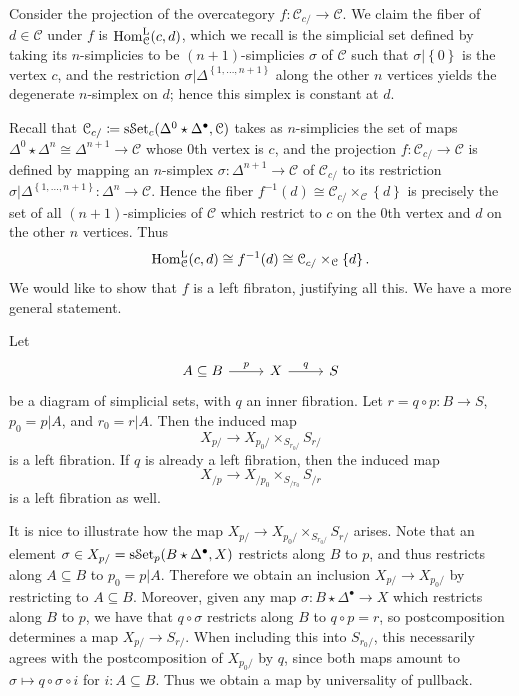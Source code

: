 Consider the projection of the overcategory $f : \mathcal{C} _{c/} \to \mathcal{C} $. We claim the fiber of $d\in \mathcal{C}$ under $f$ is $\operatorname{Hom}_\mathcal{C} ^\mathrm{L} (c, d) $, which we recall is the simplicial set defined by taking its $n$-simplicies to be $(n+1)$-simplicies $\sigma $ of $\mathcal{C} $ such that $\sigma |\left\{ 0 \right\} $ is the vertex $c$, and the restriction $\sigma |\Delta ^{\left\{ 1, \ldots ,n+1 \right\} } $ along the other $n$ vertices yields the degenerate $n$-simplex on $d$; hence this simplex is constant at $d$.

Recall that $\mathcal{C} _{c/} \coloneqq \mathrm{s}\mathcal{S}\mathrm{et}_c(\Delta^0\star\Delta ^{\bullet},\mathcal{C} )$ takes as $n$-simplicies the set of maps $\Delta ^0\star \Delta ^n \cong \Delta ^{n+1} \to \mathcal{C} $ whose 0th vertex is $c$, and the projection $f : \mathcal{C} _{c/}  \to \mathcal{C} $ is defined by mapping an $n$-simplex $\sigma : \Delta ^{n+1}  \to \mathcal{C} $ of $\mathcal{C} _{c/} $ to its restriction $\sigma |\Delta ^{\left\{ 1, \ldots ,n+1 \right\} } : \Delta ^n \to \mathcal{C} $. Hence the fiber $f^{-1} (d) \cong \mathcal{C}_{c/} \times_{\mathcal{C} } \left\{ d \right\} $ is precisely the set of all $(n+1)$-simplicies of $\mathcal{C} $ which restrict to $c$ on the 0th vertex and $d$ on the other $n$ vertices. Thus
\[
	\operatorname{Hom}_\mathcal{C} ^{\mathrm{L} } (c, d) \cong f^{-1} (d) \cong \mathcal{C} _{c/} \times _\mathcal{C} \left\{ d \right\} 
.\]
We would like to show that $f$ is a left fibraton, justifying all this. We have a more general statement.

\begin{proposition}[Joyal]\label{2.1.2.1}
	Let
	\[\begin{tikzcd}[row sep = 2.5em, column sep = 2.5em]
	A\subseteq B \ar[" p ", r]  & X \ar[" q ", r]  & S
	\end{tikzcd}\]
	be a diagram of simplicial sets, with $q$ an inner fibration. Let $r=q\circ p : B \to S$, $p_0=p|A$, and $r_0=r|A$. Then the induced map
	\[
		X_{p/} \to X_{p_0/} \times_{S_{r_0/} } S_{r/} 
	\]
	is a left fibration. If $q$ is already a left fibration, then the induced map
	\[
		X_{/p} \to X_{/p_0} \times _{S_{/r_0} } S_{/r} 
	\]
	is a left fibration as well.
\end{proposition}

\begin{remark}\label{2.1.2.2}
	It is nice to illustrate how the map $X_{p/} \to X_{p_0/} \times_{S_{r_0/}} S_{r/} $ arises. Note that an element $\sigma \in X_{p/} =\mathrm{s}\mathcal{S}\mathrm{et}_p(B \star \Delta ^{\bullet} ,X)$ restricts along $B$ to $p$, and thus restricts along $A\subseteq B$ to $p_0=p|A$. Therefore we obtain an inclusion $X_{p/} \to X_{p_0/} $ by restricting to $A\subseteq B$. Moreover, given any map $\sigma : B\star \Delta ^{\bullet}  \to X$ which restricts along $B$ to $p$, we have that $q\circ \sigma $ restricts along $B$ to $q\circ p=r$, so postcomposition determines a map $X_{p/} \to S_{r/} $. When including this into $S_{r_0/} $, this necessarily agrees with the postcomposition of $X_{p_0/} $ by $q$, since both maps amount to $\sigma\mapsto q\circ \sigma \circ i$ for $i : A \subseteq B$. Thus we obtain a map by universality of pullback.
\end{remark}

